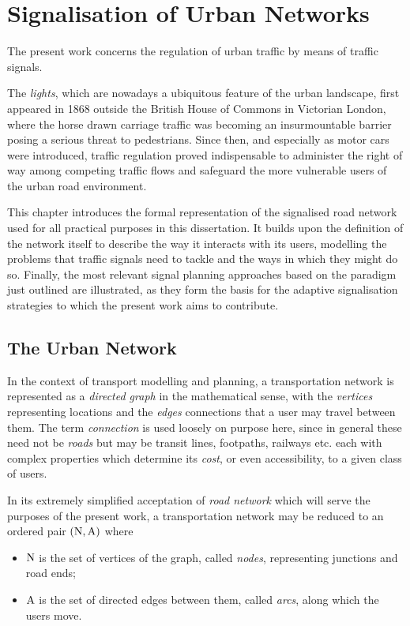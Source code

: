 \chapter{Signalisation of Urban Networks} \label{c:basics}
The present work concerns the regulation of urban traffic by means of traffic signals.

The \emph{lights}, which are nowadays a ubiquitous feature of the urban landscape, first appeared in 1868 outside the British House of Commons in Victorian London, where the horse drawn carriage traffic was becoming an insurmountable barrier posing a serious threat to pedestrians.
Since then, and especially as motor cars were introduced, traffic regulation proved indispensable to administer the right of way among competing traffic flows and safeguard the more vulnerable users of the urban road environment.

This chapter introduces the formal representation of the signalised road network used for all practical purposes in this dissertation. It builds upon the definition of the network itself to describe the way it interacts with its users, modelling the problems that traffic signals need to tackle and the ways in which they might do so. Finally, the most relevant signal planning approaches based on the paradigm just outlined are illustrated, as they form the basis for the adaptive signalisation strategies to which the present work aims to contribute.

\section{The Urban Network} \label{s:urbannetwork}
In the context of transport modelling and planning, a transportation network is represented as a \emph{directed graph} in the mathematical sense, with the \emph{vertices} representing locations and the \emph{edges} connections that a user may travel between them. The term \emph{connection} is used loosely on purpose here, since in general these need not be \emph{roads} but may be transit lines, footpaths, railways etc. each with complex properties which determine its \emph{cost}, or even accessibility, to a given class of users.

In its extremely simplified acceptation of \emph{road network} which will serve the purposes of the present work, a transportation network may be reduced to an ordered pair $(\mathrm{N},\mathrm{A})$ where
\begin{itemize}
\item $\mathrm{N}$ is the set of vertices of the graph, called \emph{nodes}, representing junctions and road ends;
\item $\mathrm{A}$ is the set of directed edges between them, called \emph{arcs}, along which the users move.
\end{itemize}

